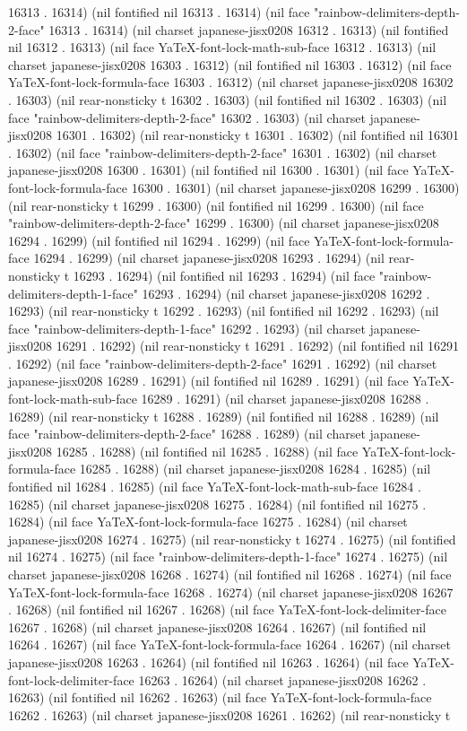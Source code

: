 16313 . 16314) (nil fontified nil 16313 . 16314) (nil face "rainbow-delimiters-depth-2-face" 16313 . 16314) (nil charset japanese-jisx0208 16312 . 16313) (nil fontified nil 16312 . 16313) (nil face YaTeX-font-lock-math-sub-face 16312 . 16313) (nil charset japanese-jisx0208 16303 . 16312) (nil fontified nil 16303 . 16312) (nil face YaTeX-font-lock-formula-face 16303 . 16312) (nil charset japanese-jisx0208 16302 . 16303) (nil rear-nonsticky t 16302 . 16303) (nil fontified nil 16302 . 16303) (nil face "rainbow-delimiters-depth-2-face" 16302 . 16303) (nil charset japanese-jisx0208 16301 . 16302) (nil rear-nonsticky t 16301 . 16302) (nil fontified nil 16301 . 16302) (nil face "rainbow-delimiters-depth-2-face" 16301 . 16302) (nil charset japanese-jisx0208 16300 . 16301) (nil fontified nil 16300 . 16301) (nil face YaTeX-font-lock-formula-face 16300 . 16301) (nil charset japanese-jisx0208 16299 . 16300) (nil rear-nonsticky t 16299 . 16300) (nil fontified nil 16299 . 16300) (nil face "rainbow-delimiters-depth-2-face" 16299 . 16300) (nil charset japanese-jisx0208 16294 . 16299) (nil fontified nil 16294 . 16299) (nil face YaTeX-font-lock-formula-face 16294 . 16299) (nil charset japanese-jisx0208 16293 . 16294) (nil rear-nonsticky t 16293 . 16294) (nil fontified nil 16293 . 16294) (nil face "rainbow-delimiters-depth-1-face" 16293 . 16294) (nil charset japanese-jisx0208 16292 . 16293) (nil rear-nonsticky t 16292 . 16293) (nil fontified nil 16292 . 16293) (nil face "rainbow-delimiters-depth-1-face" 16292 . 16293) (nil charset japanese-jisx0208 16291 . 16292) (nil rear-nonsticky t 16291 . 16292) (nil fontified nil 16291 . 16292) (nil face "rainbow-delimiters-depth-2-face" 16291 . 16292) (nil charset japanese-jisx0208 16289 . 16291) (nil fontified nil 16289 . 16291) (nil face YaTeX-font-lock-math-sub-face 16289 . 16291) (nil charset japanese-jisx0208 16288 . 16289) (nil rear-nonsticky t 16288 . 16289) (nil fontified nil 16288 . 16289) (nil face "rainbow-delimiters-depth-2-face" 16288 . 16289) (nil charset japanese-jisx0208 16285 . 16288) (nil fontified nil 16285 . 16288) (nil face YaTeX-font-lock-formula-face 16285 . 16288) (nil charset japanese-jisx0208 16284 . 16285) (nil fontified nil 16284 . 16285) (nil face YaTeX-font-lock-math-sub-face 16284 . 16285) (nil charset japanese-jisx0208 16275 . 16284) (nil fontified nil 16275 . 16284) (nil face YaTeX-font-lock-formula-face 16275 . 16284) (nil charset japanese-jisx0208 16274 . 16275) (nil rear-nonsticky t 16274 . 16275) (nil fontified nil 16274 . 16275) (nil face "rainbow-delimiters-depth-1-face" 16274 . 16275) (nil charset japanese-jisx0208 16268 . 16274) (nil fontified nil 16268 . 16274) (nil face YaTeX-font-lock-formula-face 16268 . 16274) (nil charset japanese-jisx0208 16267 . 16268) (nil fontified nil 16267 . 16268) (nil face YaTeX-font-lock-delimiter-face 16267 . 16268) (nil charset japanese-jisx0208 16264 . 16267) (nil fontified nil 16264 . 16267) (nil face YaTeX-font-lock-formula-face 16264 . 16267) (nil charset japanese-jisx0208 16263 . 16264) (nil fontified nil 16263 . 16264) (nil face YaTeX-font-lock-delimiter-face 16263 . 16264) (nil charset japanese-jisx0208 16262 . 16263) (nil fontified nil 16262 . 16263) (nil face YaTeX-font-lock-formula-face 16262 . 16263) (nil charset japanese-jisx0208 16261 . 16262) (nil rear-nonsticky t 